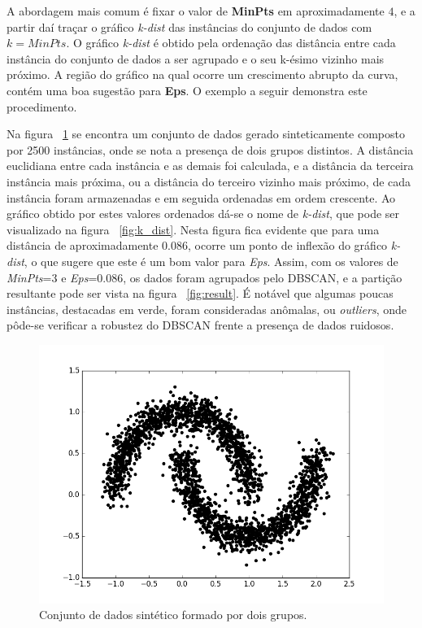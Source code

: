 A abordagem mais comum é fixar o valor de \textbf{MinPts} em aproximadamente $4$, e a partir daí traçar o gráfico \emph{k-dist} das instâncias do conjunto de dados com $k=MinPts$. O gráfico \emph{k-dist} é obtido pela ordenação das distância entre cada instância do conjunto de dados a ser agrupado e o seu k-ésimo vizinho mais próximo. A região do gráfico na qual ocorre um crescimento abrupto da curva, contém uma boa sugestão para \textbf{Eps}. O exemplo a seguir demonstra este procedimento.

Na figura ~\ref{fig:inital} se encontra um conjunto de dados gerado sinteticamente composto por 2500 instâncias, onde se nota a presença de dois grupos distintos. A distância euclidiana entre cada instância e as demais foi calculada, e a distância da terceira instância mais próxima, ou a distância do terceiro vizinho mais próximo, de cada instância foram armazenadas e em seguida ordenadas em ordem crescente. Ao gráfico obtido por estes valores ordenados dá-se o nome de \emph{k-dist}, que pode ser visualizado na figura ~\ref{fig:k_dist}. Nesta figura fica evidente que para uma distância de aproximadamente $0.086$, ocorre um ponto de inflexão do gráfico \emph{k-dist}, o que sugere que este é um bom valor para \emph{Eps}. Assim, com os valores de \emph{MinPts}=$3$ e \emph{Eps}=$0.086$, os dados foram agrupados pelo DBSCAN, e a partição resultante pode ser vista na figura ~\ref{fig:result}. É notável que algumas poucas instâncias, destacadas em verde, foram consideradas anômalas, ou \emph{outliers}, onde pôde-se verificar a robustez do DBSCAN frente a presença de dados ruidosos.

\begin{figure}[h!]
	\includegraphics[width=\linewidth]{figuras/initial.png}
	\caption{Conjunto de dados sintético formado por dois grupos.}
	\label{fig:inital}
\end{figure}


